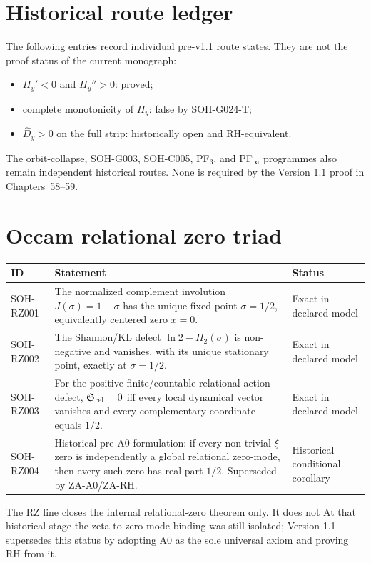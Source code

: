 \section{Historical route ledger}

The following entries record individual pre-v1.1 route states. They are not
the proof status of the current monograph:
\begin{itemize}
  \item $H_y'<0$ and $H_y''>0$: proved;
  \item complete monotonicity of $H_y$: false by SOH-G024-T;
  \item $\widehat D_y>0$ on the full strip: historically open and
  RH-equivalent.
\end{itemize}
The orbit-collapse, SOH-G003, SOH-C005, PF$_3$, and PF$_\infty$ programmes
also remain independent historical routes. None is required by the Version
1.1 proof in Chapters~58--59.


\section{Occam relational zero triad}

\begin{longtable}{@{}p{}p{}p{}@{}}
\toprule ID & Statement & Status\\
\midrule
SOH-RZ001 & The normalized complement involution \(J(\sigma)=1-\sigma\) has the unique fixed point \(\sigma=1/2\), equivalently centered zero \(x=0\). & Exact in declared model\\
SOH-RZ002 & The Shannon/KL defect \(\ln2-H_2(\sigma)\) is non-negative and vanishes, with its unique stationary point, exactly at \(\sigma=1/2\). & Exact in declared model\\
SOH-RZ003 & For the positive finite/countable relational action-defect, \(\mathfrak S_{\rm rel}=0\) iff every local dynamical vector vanishes and every complementary coordinate equals \(1/2\). & Exact in declared model\\
SOH-RZ004 & Historical pre-A0 formulation: if every non-trivial \(\xi\)-zero is independently a global relational zero-mode, then every such zero has real part \(1/2\). Superseded by ZA-A0/ZA-RH. & Historical conditional corollary\\
\bottomrule
\end{longtable}

The RZ line closes the internal relational-zero theorem only. It does not
At that historical stage the zeta-to-zero-mode binding was still isolated; Version 1.1 supersedes this status by adopting A0 as the sole universal axiom and proving RH from it.

